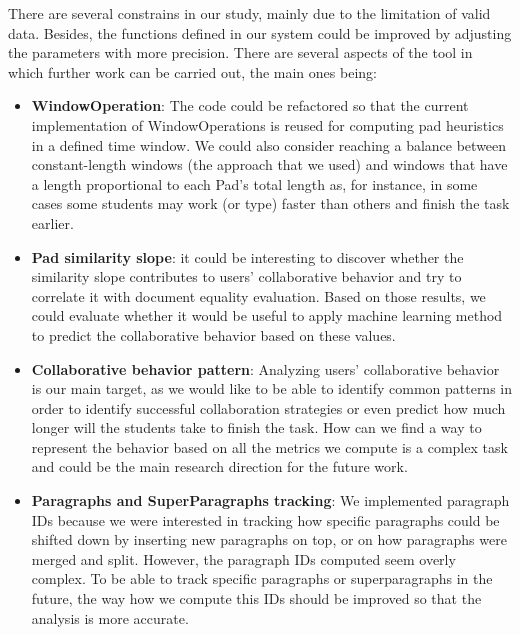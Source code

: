 There are several constrains in our study, mainly due to the limitation of valid data. Besides, the functions defined in our system could be improved by adjusting the parameters with more precision. There are several aspects of the tool in which further work can be carried out, the main ones being:
\begin{itemize}
    \item \textbf{WindowOperation}: The code could be refactored so that the current implementation of WindowOperations is reused for computing pad heuristics in a defined time window. We could also consider reaching a balance between constant-length windows (the approach that we used) and windows that have a length proportional to each Pad's total length as, for instance, in some cases some students may work (or type) faster than others and finish the task earlier.
    \item \textbf{Pad similarity slope}: it could be interesting to discover whether the similarity slope contributes to users' collaborative behavior and try to correlate it with document equality evaluation. Based on those results, we could evaluate whether it would be useful to apply machine learning method to predict the collaborative behavior based on these values.
    \item \textbf{Collaborative behavior pattern}: Analyzing users' collaborative behavior is our main target, as we would like to be able to identify common patterns in order to identify successful collaboration strategies or even predict how much longer will the students take to finish the task. How can we find a way to represent the behavior based on all the metrics we compute is a complex task and could be the main research direction for the future work.
    \item \textbf{Paragraphs and SuperParagraphs tracking}: We implemented paragraph IDs because we were interested in tracking how specific paragraphs could be shifted down by inserting new paragraphs on top, or on how paragraphs were merged and split. However, the paragraph IDs computed seem overly complex. To be able to track specific paragraphs or superparagraphs in the future, the way how we compute this IDs should be improved so that the analysis is more accurate. 
\end{itemize}